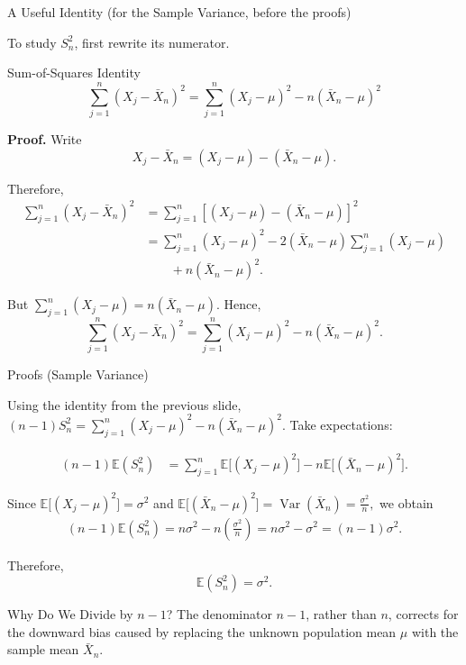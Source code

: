 \begin{frame}{A Useful Identity (for the Sample Variance, before the proofs)}

\small

To study \(S_n^2\), first rewrite its numerator.

\begin{keybox}{Sum-of-Squares Identity}
\[
\boxed{
\sum_{j=1}^n(X_j-\bar X_n)^2
=
\sum_{j=1}^n(X_j-\mu)^2
-
n(\bar X_n-\mu)^2
}
\]
\end{keybox}

\textbf{Proof.} Write
\[
X_j-\bar X_n
=
(X_j-\mu)-(\bar X_n-\mu).
\]

Therefore,
\[
\begin{aligned}
\sum_{j=1}^n(X_j-\bar X_n)^2
&=
\sum_{j=1}^n
\left[
(X_j-\mu)-(\bar X_n-\mu)
\right]^2\\
&=
\sum_{j=1}^n(X_j-\mu)^2
-2(\bar X_n-\mu)\sum_{j=1}^n(X_j-\mu)\\
&\qquad
+n(\bar X_n-\mu)^2.
\end{aligned}
\]

But $\sum_{j=1}^n(X_j-\mu)
=
n(\bar X_n-\mu).$ Hence,
\[
\sum_{j=1}^n(X_j-\bar X_n)^2
=
\sum_{j=1}^n(X_j-\mu)^2
-
n(\bar X_n-\mu)^2.
\]
\end{frame}



\begin{frame}{Proofs (Sample Variance)}
 

Using the identity from the previous slide, $(n-1)S_n^2
=
\sum_{j=1}^n(X_j-\mu)^2
-
n(\bar X_n-\mu)^2.$
Take expectations:

\[
\begin{aligned}
(n-1)\mathbb{E}(S_n^2)
&=
\sum_{j=1}^n
\mathbb{E}\bigl[(X_j-\mu)^2\bigr]
-
n\mathbb{E}\bigl[(\bar X_n-\mu)^2\bigr].
\end{aligned}
\]

Since $\mathbb{E}\bigl[(X_j-\mu)^2\bigr]=\sigma^2$ and $\mathbb{E}\bigl[(\bar X_n-\mu)^2\bigr]
=
\operatorname{Var}(\bar X_n)
=
\frac{\sigma^2}{n},$
 we obtain
\[
\begin{aligned}
(n-1)\mathbb{E}(S_n^2)
=
n\sigma^2
-
n\left(\frac{\sigma^2}{n}\right) =
n\sigma^2-\sigma^2 =
(n-1)\sigma^2.
\end{aligned}
\]

Therefore,
\[
\boxed{\mathbb{E}(S_n^2)=\sigma^2.}
\]

\begin{keybox}{Why Do We Divide by \(n-1\)?}
The denominator \(n-1\), rather than \(n\), corrects for the downward bias caused
by replacing the unknown population mean \(\mu\) with the sample mean \(\bar X_n\).
\end{keybox}

\end{frame}



